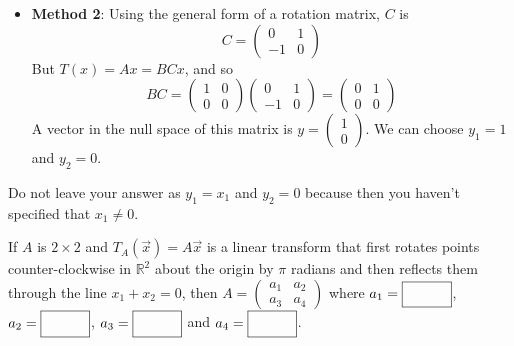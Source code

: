 {\begin{itemize}
        \item \textbf{Method 2}: Using the general form of a rotation matrix, $C$ is $$C = \begin{pmatrix} 0&1\\-1&0\end{pmatrix}$$
        But $T(x) = Ax = BCx$, and so
        $$BC = \begin{pmatrix} 1&0\\0&0\end{pmatrix}\begin{pmatrix} 0&1\\-1&0\end{pmatrix} = \begin{pmatrix} 0 & 1 \\ 0&0\end{pmatrix}$$
        A vector in the null space of this matrix is $y = \begin{pmatrix} 1\\0\end{pmatrix}$. We can choose $y_1 = 1$ and $y_2=0$. 
    \end{itemize}
    Do not leave your answer as $y_1 = x_1$ and $y_2=0$ because then you haven't specified that $x_1 \ne 0$. 
    } 
    \fi    

\fi 
\ifnum {}
    If $A$ is $2 \times 2$ and $T_A(\vec x)=A\vec x$ is a linear transform that first rotates points counter-clockwise in $\mathbb R^2$ about the origin by $\pi$ radians and then reflects them through the line $x_1+x_2 = 0$, then $A=\begin{pmatrix} a_1 & a_2 \\ a_3 & a_4 \end{pmatrix} $ where $a_1 = \framebox{\strut\hspace{1.0cm}}$, $a_2 = \framebox{\strut\hspace{1.0cm}}$, $a_3 = \framebox{\strut\hspace{1.0cm}}$ and $a_4 = \framebox{\strut\hspace{1.0cm}}$.
    

